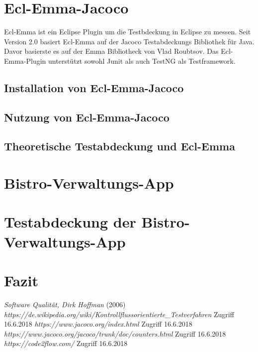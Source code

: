 \documentclass[a4paper]{article}
\author{Mario Groneick, Marcel Brockskothen}
\begin{document}

\tableofcontents
\section{Ecl-Emma-Jacoco}
Ecl-Emma ist ein Eclipse Plugin um die Testbdeckung in Eclipse zu messen.
Seit Version 2.0 basiert Ecl-Emma auf der Jacoco Testabdeckungs Bibliothek für Java.
Davor basierste es auf der Emma Bibliotheck von Vlad Roubtsov. Das Ecl-Emma-Plugin unterstützt
sowohl Junit als auch TestNG als Testframework.
\subsection{Installation von Ecl-Emma-Jacoco}
\subsection{Nutzung von Ecl-Emma-Jacoco}
\subsection{Theoretische Testabdeckung und Ecl-Emma}
\section{Bistro-Verwaltungs-App}
\section{Testabdeckung der Bistro-Verwaltungs-App}
\section{Fazit}
\begin{thebibliography}{1}
	 \emph{Software Qualität, Dirk Hoffman} (2006)
	 \emph{https://de.wikipedia.org/wiki/Kontrollflussorientierte\_Testverfahren} Zugriff 16.6.2018
	 \emph{https://www.jacoco.org/index.html} Zugriff 16.6.2018
	 \emph{https://www.jacoco.org/jacoco/trunk/doc/counters.html} Zugriff 16.6.2018
	 \emph{https://code2flow.com/} Zugriff 16.6.2018
\end{thebibliography}
\end{document}
